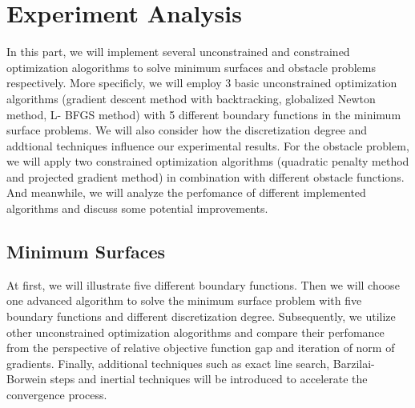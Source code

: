 \section{Experiment Analysis}
In this part, we will implement several unconstrained and constrained optimization alogorithms to solve minimum surfaces and obstacle problems respectively. More specificly, we will employ 3 basic unconstrained optimization algorithms (gradient descent method with backtracking, globalized Newton method, L- BFGS method) with 5 different boundary functions in the minimum surface problems. We will also consider how the discretization degree and addtional techniques influence our experimental results. For the obstacle problem, we will apply two constrained optimization algorithms (quadratic penalty method and projected gradient method) in combination with different obstacle functions. And meanwhile, we will analyze the perfomance of different implemented algorithms and discuss some potential improvements.
\subsection{Minimum Surfaces}
At first, we will illustrate five different boundary functions. Then we will choose one advanced algorithm to solve the minimum surface problem with five boundary functions and different discretization degree. Subsequently, we utilize other unconstrained optimization alogorithms and compare their perfomance from the perspective of relative objective function gap and iteration of norm of gradients. Finally, additional techniques such as exact line search, Barzilai-Borwein steps and inertial techniques will be introduced to accelerate the convergence process.

